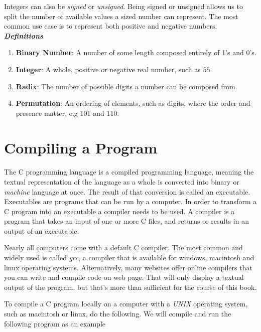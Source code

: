 Integers can also be \textit{signed} or \textit{unsigned}. Being signed or unsigned allows us to split the number of available values a sized number can represent. The most common use case is to represent both positive and negative numbers. \\

\emph{\textbf{Definitions}}
\begin{enumerate}
\item \textbf{Binary Number}: A number of some length composed entirely of 1's and 0's.
\item \textbf{Integer}: A whole, positive or negative real number, such as $55$.
\item \textbf{Radix}: The number of possible digits a number can be composed from.
\item \textbf{Permutation}: An ordering of elements, such as digits, where the order and presence matter, e.g $101$ and $110$.
\end{enumerate}

\section{Compiling a Program}

\paragraph{   } The C programming language is a compiled programming language, meaning the textual representation of the language as a whole is converted into binary or \textit{machine} language at once. The result of that conversion is called an executable. Executables are programs that can be run by a computer. In order to transform a C program into an executable a compiler needs to be used. A compiler is a program that takes an input of one or more C files, and returns or results in an output of an executable.

\par Nearly all computers come with a default C compiler. The most common and widely used is called \textit{gcc}, a compiler that is available for windows, macintosh and linux operating systems. Alternatively, many websites offer online compilers that you can write and compile code on web page. That will only display a textual output of the program, but that's more than sufficient for the course of this book.

\par To compile a C program locally on a computer with a \textit{UNIX} operating system, such as macintosh or linux, do the following. We will compile and run the following program as an example

